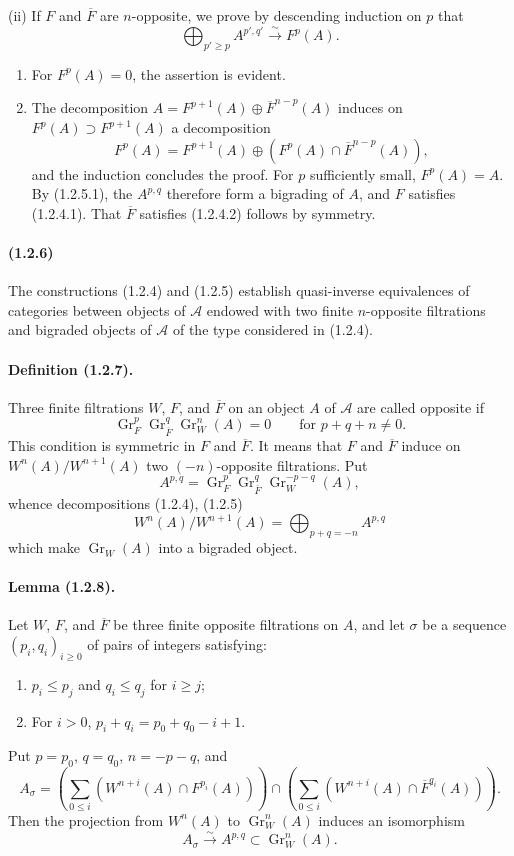 \documentclass[10pt]{article}
\newcommand{\Gr}{\operatorname{Gr}}
\newcommand{\calA}{\mathcal A}
\newcommand{\iso}{\xrightarrow{\sim}}
\begin{document}
(ii) If $F$ and $\overline F$ are $n$-opposite, we prove by descending induction on $p$ that
\[
\tag{1.2.5.1}
\bigoplus_{p'\ge p} A^{p',q'}\iso F^p(A).
\]
\begin{enumerate}[label=\alph*)]
\item For $F^p(A)=0$, the assertion is evident.
\item The decomposition $A=F^{p+1}(A)\oplus\overline F^{n-p}(A)$ induces on $F^p(A)\supset F^{p+1}(A)$ a decomposition
\[
F^p(A)=F^{p+1}(A)\oplus(F^p(A)\cap\overline F^{n-p}(A)),
\]
and the induction concludes the proof. For $p$ sufficiently small, $F^p(A)=A$. By (1.2.5.1), the $A^{p,q}$ therefore form a bigrading of $A$, and $F$ satisfies (1.2.4.1). That $\overline F$ satisfies (1.2.4.2) follows by symmetry.
\end{enumerate}

\paragraph{(1.2.6)} The constructions (1.2.4) and (1.2.5) establish quasi-inverse equivalences of categories between objects of $\calA$ endowed with two finite $n$-opposite filtrations and bigraded objects of $\calA$ of the type considered in (1.2.4).

\paragraph{Definition (1.2.7).} Three finite filtrations $W$, $F$, and $\overline F$ on an object $A$ of $\calA$ are called opposite if
\[
\Gr_F^p\Gr_{\overline F}^{q}\Gr_W^n(A)=0\qquad\text{for }p+q+n\ne0.
\]
This condition is symmetric in $F$ and $\overline F$. It means that $F$ and $\overline F$ induce on $W^n(A)/W^{n+1}(A)$ two $(-n)$-opposite filtrations. Put
\[
A^{p,q}=\Gr_F^p\Gr_{\overline F}^{q}\Gr_W^{-p-q}(A),
\]
whence decompositions (1.2.4), (1.2.5)
\[
\tag{1.2.7.1}
W^n(A)/W^{n+1}(A)=\bigoplus_{p+q=-n}A^{p,q}
\]
which make $\Gr_W(A)$ into a bigraded object.

\paragraph{Lemma (1.2.8).} Let $W$, $F$, and $\overline F$ be three finite opposite filtrations on $A$, and let $\sigma$ be a sequence $(p_i,q_i)_{i\ge0}$ of pairs of integers satisfying:
\begin{enumerate}[label=\alph*)]
\item $p_i\le p_j$ and $q_i\le q_j$ for $i\ge j$;
\item For $i>0$, $p_i+q_i=p_0+q_0-i+1$.
\end{enumerate}
Put $p=p_0$, $q=q_0$, $n=-p-q$, and
\[
A_\sigma=\left(\sum_{0\le i} (W^{n+i}(A)\cap F^{p_i}(A))\right)
\cap
\left(\sum_{0\le i} (W^{n+i}(A)\cap \overline F^{q_i}(A))\right).
\]
Then the projection from $W^n(A)$ to $\Gr_W^n(A)$ induces an isomorphism
\[
A_\sigma\iso A^{p,q}\subset\Gr_W^n(A).
\]
\end{document}
